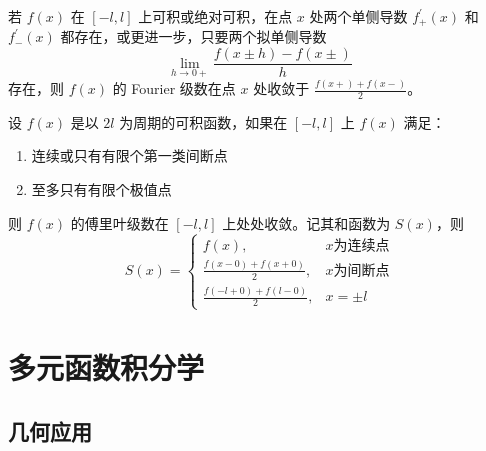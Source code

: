 \documentclass{ctexbook}
\begin{document}
\begin{corollary}
    若 $f(x)$ 在 $[-l,l]$ 上可积或绝对可积，在点 $x$ 处两个单侧导数 $f_+^\prime (x)$ 和 $f_-^\prime(x)$ 都存在，或更进一步，只要两个拟单侧导数
    \begin{equation}
        \lim_{h\rightarrow 0+}\frac{f(x\pm h)-f(x\pm)}{h}
    \end{equation}
    存在，则 $f(x)$ 的 Fourier 级数在点 $x$ 处收敛于 $\frac{f(x+)+f(x-)}{2}$。
\end{corollary}

\begin{theorem}
    设 $f(x)$ 是以 $2l$ 为周期的可积函数，如果在 $[-l,l]$ 上 $f(x)$ 满足：
    \begin{enumerate}
        \item 连续或只有有限个第一类间断点
        \item 至多只有有限个极值点
    \end{enumerate}
    则 $f(x)$ 的傅里叶级数在 $[-l,l]$ 上处处收敛。记其和函数为 $S(x)$，则
    \begin{equation}
        S(x)=\begin{cases}
            f(x), & x \text{为连续点}\\
            \frac{f(x-0)+f(x+0)}{2}, &x \text{为间断点}\\
            \frac{f(-l+0)+f(l-0)}{2}, &x =\pm l
        \end{cases}
    \end{equation}
\end{theorem}

\chapter{多元函数积分学}

\section{几何应用}
\end{document}
